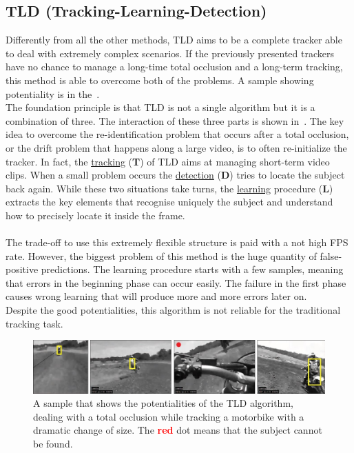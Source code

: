\subsection{TLD (Tracking-Learning-Detection)} \label{sec:tld}
Differently from all the other methods, TLD\cite{tld} aims to be a complete tracker able to deal with extremely complex scenarios. If the previously presented trackers have no chance to manage a long-time total occlusion and a long-term tracking, this method is able to overcome both of the problems. A sample showing potentiality is in the~.\\
The foundation principle is that TLD is not a single algorithm but it is a combination of three. The interaction of these three parts is shown in~. The key idea to overcome the re-identification problem that occurs after a total occlusion, or the drift problem that happens along a large video, is to often re-initialize the tracker. In fact, the \underline{tracking} (\textbf{T}) of TLD aims at managing short-term video clips. When a small problem occurs the \underline{detection} (\textbf{D}) tries to locate the subject back again. While these two situations take turns, the \underline{learning} procedure (\textbf{L}) extracts the key elements that recognise uniquely the subject and understand how to precisely locate it inside the frame.\\
\\
The trade-off to use this extremely flexible structure is paid with a not high FPS rate. However, the biggest problem of this method is the huge quantity of false-positive predictions. The learning procedure starts with a few samples, meaning that errors in the beginning phase can occur easily. The failure in the first phase causes wrong learning that will produce more and more errors later on.\\
Despite the good potentialities, this algorithm is not reliable for the traditional tracking task.
\begin{figure}[!h]
	\centering
	\includegraphics[width=.9\linewidth]{images/tracking/sample_TLD}
	\captionsetup{margin=0.5cm}
	\caption[TLD algorithm applied on a total occlusion video clip.]{A sample that shows the potentialities of the TLD algorithm, dealing with a total occlusion while tracking a motorbike with a dramatic change of size. The \textbf{\textcolor{red}{red}} dot means that the subject cannot be found.}
	\label{fig:sample_TLD}
\end{figure}



